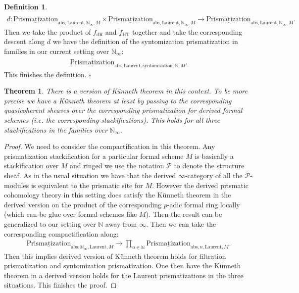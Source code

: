 \documentclass[12pt]{article}
\newtheorem{theorem}{Theorem}
\theoremstyle{definition}
\newtheorem{definition}{Definition}
\begin{document}
\begin{definition}
\begin{align}
\end{align}
\begin{align}
d:  {\underline{\mathrm{Prismatization}}}_{\mathrm{abs},\mathrm{Laurent},\mathbb{N}_\infty,M}\times {\underline{\mathrm{Prismatization}}}_{\mathrm{abs},\mathrm{Laurent},\mathbb{N}_\infty,M} \rightarrow {\underline{\mathrm{Prismatization}}}_{\mathrm{abs},\mathrm{Laurent},\mathbb{N}_\infty,M}.
\end{align}
Then we take the product of $f_\mathrm{dR}$ and $f_\mathrm{HT}$ together and take the corresponding descent along $d$ we have the definition of the syntomization prismatization in families in our current setting over $\mathbb{N}_\infty$:
\begin{align}
\overline{\underline{\mathrm{Prismatization}}}_{\mathrm{abs},\mathrm{Laurent},\mathrm{syntomization},\mathbb{N},M}. 
\end{align}
This finishes the definition. $\square$
\end{definition}

\begin{theorem}
There is a version of K\"unneth theorem in this context. To be more precise we have a K\"unneth theorem at least by passing to the corresponding quasicoherent sheaves over the corresponding prismatization for derived formal schemes (i.e. the corresponding stackifications). This holds for all three stackifications in the families over $\mathbb{N}_\infty$. 
\end{theorem}

\begin{proof}
We need to consider the compactification in this theorem. Any prismatization  stackification for a particular formal scheme $M$ is basically a stackification over $M$ and ringed we use the notation $\mathcal{P}$ to denote the structure sheaf. As in the usual situation we have that the derived $\infty$-category of all the $\mathcal{P}$-modules is equivalent to the prismatic site for $M$. However the derived prismatic cohomology theory in this setting does satisfy the K\"unneth theorem in the derived version on the product of the corresponding $p$-adic formal ring locally (which can be glue over formal schemes like $M$). Then the result can be generalized to our setting over $\mathbb{N}$ away from $\infty$. Then we can take the corresponding compactification along:
\begin{align}
{\underline{\mathrm{Prismatization}}}_{\mathrm{abs},\mathbb{N}_\infty,\mathrm{Laurent},M}\rightarrow  \prod_{n\in \mathbb{N}} {\underline{\mathrm{Prismatization}}}_{\mathrm{abs},n,\mathrm{Laurent},M}.
\end{align}
Then this implies derived version of K\"unneth theorem holds for filtration prismatization and syntomization prismatization. One then have the K\"unneth theorem in a derived version holds for the Laurent prismatizations in the three situations. This finishes the proof.
\end{proof}
\end{document}
